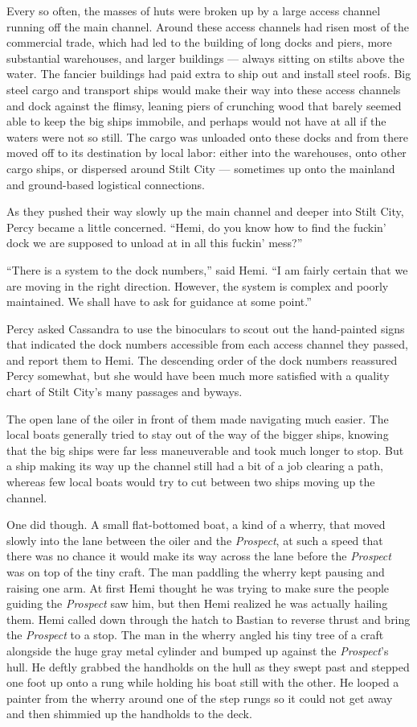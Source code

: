 \documentclass[
]{scrbook}
\begin{document}
Every so often, the masses of huts were broken up by a large access
channel running off the main channel. Around these access channels had
risen most of the commercial trade, which had led to the building of
long docks and piers, more substantial warehouses, and larger buildings
--- always sitting on stilts above the water. The fancier buildings had
paid extra to ship out and install steel roofs. Big steel cargo and
transport ships would make their way into these access channels and dock
against the flimsy, leaning piers of crunching wood that barely seemed
able to keep the big ships immobile, and perhaps would not have at all
if the waters were not so still. The cargo was unloaded onto these docks
and from there moved off to its destination by local labor: either into
the warehouses, onto other cargo ships, or dispersed around Stilt City
--- sometimes up onto the mainland and ground-based logistical
connections.

As they pushed their way slowly up the main channel and deeper into
Stilt City, Percy became a little concerned. ``Hemi, do you know how to
find the fuckin' dock we are supposed to unload at in all this fuckin'
mess?''

``There is a system to the dock numbers,'' said Hemi. ``I am fairly
certain that we are moving in the right direction. However, the system
is complex and poorly maintained. We shall have to ask for guidance at
some point.''

Percy asked Cassandra to use the binoculars to scout out the
hand-painted signs that indicated the dock numbers accessible from each
access channel they passed, and report them to Hemi. The descending
order of the dock numbers reassured Percy somewhat, but she would have
been much more satisfied with a quality chart of Stilt City's many
passages and byways.

The open lane of the oiler in front of them made navigating much easier.
The local boats generally tried to stay out of the way of the bigger
ships, knowing that the big ships were far less maneuverable and took
much longer to stop. But a ship making its way up the channel still had
a bit of a job clearing a path, whereas few local boats would try to cut
between two ships moving up the channel.

One did though. A small flat-bottomed boat, a kind of a wherry, that
moved slowly into the lane between the oiler and the \emph{Prospect}, at
such a speed that there was no chance it would make its way across the
lane before the \emph{Prospect} was on top of the tiny craft. The man
paddling the wherry kept pausing and raising one arm. At first Hemi
thought he was trying to make sure the people guiding the
\emph{Prospect} saw him, but then Hemi realized he was actually hailing
them. Hemi called down through the hatch to Bastian to reverse thrust
and bring the \emph{Prospect} to a stop. The man in the wherry angled
his tiny tree of a craft alongside the huge gray metal cylinder and
bumped up against the \emph{Prospect}'s hull. He deftly grabbed the
handholds on the hull as they swept past and stepped one foot up onto a
rung while holding his boat still with the other. He looped a painter
from the wherry around one of the step rungs so it could not get away
and then shimmied up the handholds to the deck.
\end{document}
